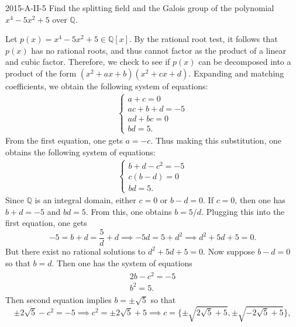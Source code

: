 \documentclass{article}
\begin{document}
	
	\begin{prb}{2015-A-II-5}
		Find the splitting field and the Galois group of the polynomial $x^{4} - 5x^{2} + 5$ over $\mathbb{Q}$. 
	\end{prb}
	Let $p(x) = x^{4} - 5x^{2} + 5 \in \mathbb{Q}[x]$. By the rational root test, it follows that $p(x)$ has no rational roots, and thus cannot factor as the product of a linear and cubic factor. Therefore, we check to see if $p(x)$ can be decomposed into a product of the form $(x^{2} + ax + b)(x^{2} + cx + d)$. Expanding and matching coefficients, we obtain the following system of equations: 
	\begin{align*}
		\begin{cases}
			a + c = 0 \\
			ac + b + d = -5 \\
			ad + bc = 0 \\
			bd = 5. 
		\end{cases}
	\end{align*}
	From the first equation, one gets $a = -c$. Thus making this substitution, one obtains the following system of equations: 
	\begin{align*}
		\begin{cases}
			b + d - c^{2} = -5 \\
			c(b - d) = 0 \\
			bd = 5. 
		\end{cases}
	\end{align*}
	Since $\mathbb{Q}$ is an integral domain, either $c = 0$ or $b - d = 0$. If $c = 0$, then one has $b + d= -5$ and $bd = 5$. From this, one obtains $b = 5/d$. Plugging this into the first equation, one gets 
	\begin{equation*}
		-5 = b + d = \frac{5}{d} + d \implies -5d = 5  + d^{2} \implies d^{2} + 5d + 5 = 0. 
	\end{equation*}
	But there exist no rational solutions to $d^{2} + 5d + 5 =0$. Now suppose $b - d = 0$ so that $b = d$. Then one has the system of equations 
	\begin{align*}
		\begin{split}
			2b - c^{2} = -5 \\
			b^{2} = 5. 
		\end{split}
	\end{align*}
	Then second equation implies $b= \pm \sqrt{5}$ so that 
	\begin{equation*}
		\pm 2\sqrt{5} - c^{2} = -5 \implies c^{2} = \pm 2\sqrt{5} + 5 \implies c = \{\pm \sqrt{2\sqrt{5} + 5}, \pm \sqrt{-2\sqrt{5} + 5}\}, 
	\end{equation*}
\end{document}
